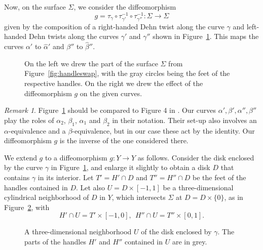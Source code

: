\documentclass [11pt]{amsart}
\theoremstyle{remark}
\newtheorem {remark}[theorem]{Remark}
\begin{document}
Now, on the surface $\Sigma$, we consider the diffeomorphism 
$$g = \tau_{\gamma} \circ \tau_{\gamma'}^{-1} \circ \tau_{\gamma''}^{-1} : \Sigma \to \Sigma$$  
given by the composition of a right-handed Dehn twist along the curve $\gamma$ and left-handed Dehn twists along the curves $\gamma'$ and $\gamma''$ shown in Figure~\ref{fig:handleswap1}. This maps the curves $\alpha'$ to $\hat{\alpha}'$ and $\beta''$ to $\hat{\beta}''$.

\begin {figure}
\begin {center}

\caption {On the left we drew the part of the surface $\Sigma$ from Figure~\ref{fig:handleswap}, with the gray circles being the feet of the respective handles. On the right we drew the effect of the diffeomorphism $g$ on the given curves.}
\label{fig:handleswap1}
\end {center}
\end {figure}

\begin{remark}
Figure~\ref{fig:handleswap1} should be compared to Figure 4 in \cite{JuhaszThurston}. Our curves $\alpha', \beta', \alpha'', \beta''$ play the roles of $\alpha_2$, $\beta_1$, $\alpha_1$ and $\beta_2$ in their notation. Their set-up also involves an $\alpha$-equivalence and a $\beta$-equivalence, but in our case these act by the identity. Our diffeomorphism $g$ is the inverse of the one considered there.
\end{remark}

We extend $g$ to a diffeomorphism $g: Y \to Y$ as follows. Consider the disk enclosed by the curve $\gamma$ in Figure~\ref{fig:handleswap1}, and enlarge it slightly to obtain a disk $D$ that contains $\gamma$ in its interior. Let $T' = H' \cap D$ and $T'' = H'' \cap D$ be the feet of the handles contained in $D$. Let also $U= D \times [-1,1]$ be a three-dimensional cylindrical neighborhood of $D$ in $Y$, which intersects $\Sigma$ at $D= D \times \{0\}$, as in Figure~\ref{fig:cylinder}, with 
$$H' \cap U = T' \times [-1,0], \ \ H'' \cap U =  T'' \times [0,1].$$

\begin {figure}
\begin {center}

\caption {A three-dimensional neighborhood $U$ of the disk enclosed by $\gamma$. The parts of the handles $H'$ and $H''$ contained in $U$ are in grey.}
\label{fig:cylinder}
\end {center}
\end {figure}
\end{document}
